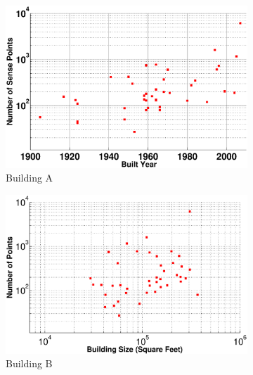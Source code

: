 \begin{figure}[h]
\centering
	\begin{subfigure}{0.33\textwidth}
                \centering
		\includegraphics[width=\textwidth]{./figs/pts_vs_yearbuilt.eps}
                \caption{Building A}
	\end{subfigure}
	\begin{subfigure}{0.33\textwidth}
                \centering
		\includegraphics[width=\textwidth]{./figs/pts_vs_buildsz.eps}
                \caption{Building B}
	\end{subfigure}
\caption{}
\label{fig:sense_pts_data}
\end{figure}



